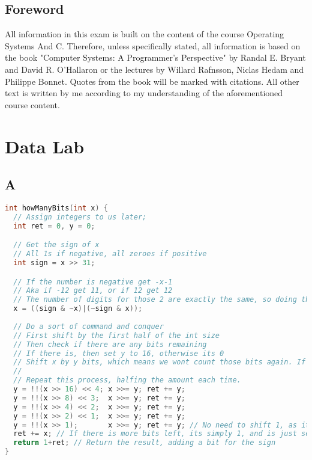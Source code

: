 \documentclass[11pt]{report}
\begin{document}

\tableofcontents
\newpage

\section*{Foreword}
All information in this exam is built on the content of the course Operating Systems And C. Therefore, unless specifically stated, all information is based on the book "Computer Systems: A Programmer's Perspective" by Randal E. Bryant and David R. O'Hallaron\cite{computer-systems} or the lectures by Willard Rafnsson, Niclas Hedam and Philippe Bonnet. Quotes from the book will be marked with citations. All other text is written by me according to my understanding of the aforementioned course content.\\[1ex]

\chapter{Data Lab}
\section{A}
\begin{lstlisting}[language=C]
int howManyBits(int x) {
  // Assign integers to us later;
  int ret = 0, y = 0;

  // Get the sign of x
  // All 1s if negative, all zeroes if positive
  int sign = x >> 31;

  // If the number is negative get -x-1 
  // Aka if -12 get 11, or if 12 get 12
  // The number of digits for those 2 are exactly the same, so doing this just makes it significantly easier to work with
  x = ((sign & ~x)|(~sign & x));
 
  // Do a sort of command and conquer
  // First shift by the first half of the int size
  // Then check if there are any bits remaining
  // If there is, then set y to 16, otherwise its 0
  // Shift x by y bits, which means we wont count those bits again. If there was less than 16 bits, nothing happens.
  //  
  // Repeat this process, halfing the amount each time. 
  y = !!(x >> 16) << 4; x >>= y; ret += y;
  y = !!(x >> 8) << 3;  x >>= y; ret += y;
  y = !!(x >> 4) << 2;  x >>= y; ret += y;
  y = !!(x >> 2) << 1;  x >>= y; ret += y;
  y = !!(x >> 1);       x >>= y; ret += y; // No need to shift 1, as it would be by 0
  ret += x; // If there is more bits left, its simply 1, and is just set to x
  return 1+ret; // Return the result, adding a bit for the sign
}
\end{lstlisting}
\end{document}

